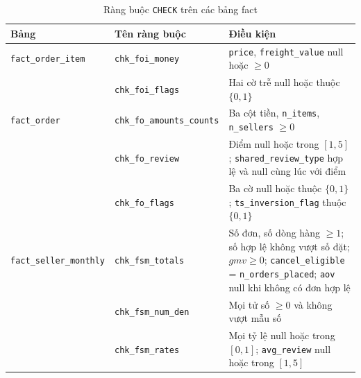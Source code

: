 \documentclass[a4paper]{article}
\begin{document}
\begin{table}[htbp]
\centering
\footnotesize
\setlength{\tabcolsep}{3pt}
\renewcommand{\arraystretch}{1.1}
\caption{Ràng buộc \texttt{CHECK} trên các bảng fact}
\label{tab:pl_check}
\begin{tabularx}{\textwidth}{@{}>{\raggedright\arraybackslash}p{2.9cm}>{\raggedright\arraybackslash}p{3.3cm}>{\raggedright\arraybackslash}X@{}}
\toprule
\textbf{Bảng} & \textbf{Tên ràng buộc} & \textbf{Điều kiện} \\
\midrule
\texttt{fact\_\allowbreak{}order\_\allowbreak{}item} & \texttt{chk\_\allowbreak{}foi\_\allowbreak{}money} & \texttt{price}, \texttt{freight\_\allowbreak{}value} null hoặc $\ge 0$ \\
 & \texttt{chk\_\allowbreak{}foi\_\allowbreak{}flags} & Hai cờ trễ null hoặc thuộc $\{0, 1\}$ \\
\addlinespace
\texttt{fact\_\allowbreak{}order} & \texttt{chk\_\allowbreak{}fo\_\allowbreak{}amounts\_\allowbreak{}counts} & Ba cột tiền, \texttt{n\_\allowbreak{}items}, \texttt{n\_\allowbreak{}sellers} $\ge 0$ \\
 & \texttt{chk\_\allowbreak{}fo\_\allowbreak{}review} & Điểm null hoặc trong $[1, 5]$; \texttt{shared\_\allowbreak{}review\_\allowbreak{}type} hợp lệ và null cùng lúc với điểm \\
 & \texttt{chk\_\allowbreak{}fo\_\allowbreak{}flags} & Ba cờ null hoặc thuộc $\{0, 1\}$; \texttt{ts\_\allowbreak{}inversion\_\allowbreak{}flag} thuộc $\{0, 1\}$ \\
\addlinespace
\texttt{fact\_\allowbreak{}seller\_\allowbreak{}monthly} & \texttt{chk\_\allowbreak{}fsm\_\allowbreak{}totals} & Số đơn, số dòng hàng $\ge 1$; số hợp lệ không vượt số đặt; $\textit{gmv} \ge 0$; \texttt{cancel\_\allowbreak{}eligible} = \texttt{n\_\allowbreak{}orders\_\allowbreak{}placed}; \texttt{aov} null khi không có đơn hợp lệ \\
 & \texttt{chk\_\allowbreak{}fsm\_\allowbreak{}num\_\allowbreak{}den} & Mọi tử số $\ge 0$ và không vượt mẫu số \\
 & \texttt{chk\_\allowbreak{}fsm\_\allowbreak{}rates} & Mọi tỷ lệ null hoặc trong $[0, 1]$; \texttt{avg\_\allowbreak{}review} null hoặc trong $[1, 5]$ \\
\bottomrule
\end{tabularx}
\end{table}
\end{document}
